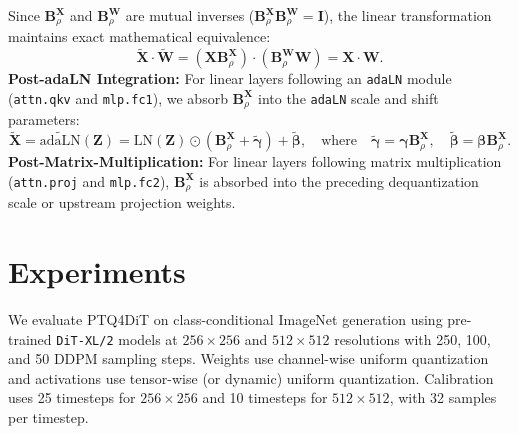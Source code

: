 \documentclass[10pt,a4paper]{article}
\begin{document}
Since $\mathbf{B}_\rho^{\mathbf{X}}$ and $\mathbf{B}_\rho^{\mathbf{W}}$ are mutual inverses ($\mathbf{B}_\rho^{\mathbf{X}} \mathbf{B}_\rho^{\mathbf{W}} = \mathbf{I}$), the linear transformation maintains exact mathematical equivalence:
\begin{equation}
\widetilde{\mathbf{X}} \cdot \widetilde{\mathbf{W}} = (\mathbf{X}\mathbf{B}_\rho^{\mathbf{X}}) \cdot (\mathbf{B}_\rho^{\mathbf{W}}\mathbf{W}) = \mathbf{X} \cdot \mathbf{W}.
\label{eq:12}
\end{equation}
\textbf{Post-adaLN Integration:} For linear layers following an \texttt{adaLN} module (\texttt{attn.qkv} and \texttt{mlp.fc1}), we absorb $\mathbf{B}_\rho^{\mathbf{X}}$ into the \texttt{adaLN} scale and shift parameters:
\begin{equation}
\widetilde{\mathbf{X}} = \widetilde{\mathrm{adaLN}}(\mathbf{Z}) = \mathrm{LN}(\mathbf{Z}) \odot (\mathbf{B}_\rho^{\mathbf{X}} + \widetilde{\boldsymbol{\gamma}}) + \widetilde{\boldsymbol{\beta}}, \quad \text{where} \quad \widetilde{\boldsymbol{\gamma}} = \boldsymbol{\gamma}\mathbf{B}_\rho^{\mathbf{X}}, \quad \widetilde{\boldsymbol{\beta}} = \boldsymbol{\beta}\mathbf{B}_\rho^{\mathbf{X}}.
\label{eq:13}
\end{equation}
\textbf{Post-Matrix-Multiplication:} For linear layers following matrix multiplication (\texttt{attn.proj} and \texttt{mlp.fc2}), $\mathbf{B}_\rho^{\mathbf{X}}$ is absorbed into the preceding dequantization scale or upstream projection weights.

\section{Experiments}

We evaluate PTQ4DiT on class-conditional ImageNet generation using pre-trained \texttt{DiT-XL/2} models at $256 \times 256$ and $512 \times 512$ resolutions with 250, 100, and 50 DDPM sampling steps. Weights use channel-wise uniform quantization and activations use tensor-wise (or dynamic) uniform quantization. Calibration uses 25 timesteps for $256 \times 256$ and 10 timesteps for $512 \times 512$, with 32 samples per timestep.
\end{document}
